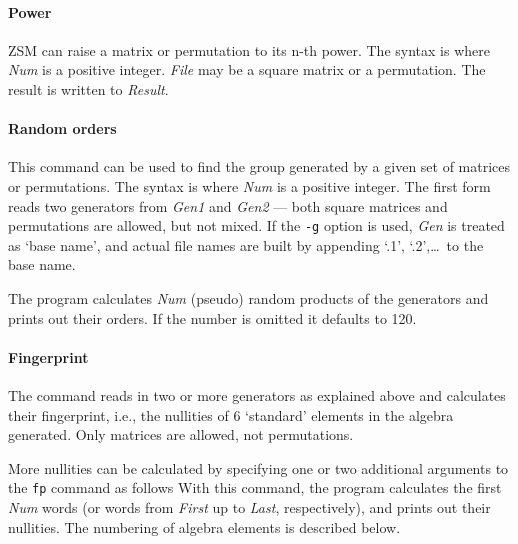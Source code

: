\paragraph{Power}
ZSM can raise a matrix or permutation to its n-th power. The syntax is
where {\it Num} is a positive integer. {\it File} may be a square
matrix or a permutation. The result is written to {\it Result}.


\paragraph{Random orders}
This command can be used to find the group generated by a given set
of matrices or permutations. The syntax is
where {\it Num} is a positive integer.
The first form reads two generators from {\it Gen1} and {\it Gen2} ---
both square matrices and permutations are allowed, but not mixed.
If the {\tt -g} option is used, {\it Gen} is treated as `base name',
and actual file names are built by appending `.1', `.2',\ldots\ to
the base name.

The program calculates {\it Num} (pseudo) random products of the
generators and prints out their orders. If the number is omitted it
defaults to 120.


\paragraph{Fingerprint}
The command
reads in two or more generators as explained above and calculates
their fingerprint, i.e., the nullities of 6 `standard' elements in
the algebra generated. Only matrices are allowed, not permutations.

More nullities can be calculated by specifying one or two
additional arguments to the {\tt fp} command as follows 
With this command, the program calculates the first {\it Num} words
(or words from {\it First} up to {\it Last}, respectively), and
prints out their nullities.
The numbering of algebra elements is described below.

